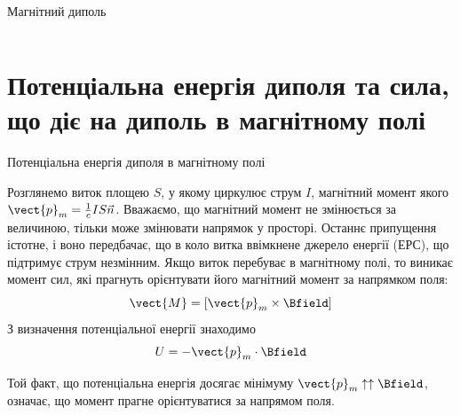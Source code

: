 \documentclass{beamer}
\begin{document}
\begin{frame}{Магнітний диполь}{}
\begin{onlyenv}
\begin{columns}
\begin{column}{0.3\linewidth}
			\end{column}
		\end{columns}
	\end{onlyenv}
\end{frame}

\section{Потенціальна енергія диполя та сила, що діє на диполь в магнітному полі}




\begin{frame}{Потенціальна енергія диполя в магнітному полі}{}\small
\begin{block}{}\justifying
Розглянемо виток площею $S$, у якому циркулює струм $I$, магнітний момент якого $\vect{p}_m = \frac1c IS\vec{n}$. Вважаємо, що магнітний момент не
змінюється за величиною, тільки може змінювати напрямок у просторі. Останнє припущення істотне, і воно передбачає, що в коло витка ввімкнене
\alert{джерело енергії (ЕРС)}, що підтримує струм незмінним. Якщо виток перебуває в магнітному полі, то виникає момент сил, які прагнуть орієнтувати
його магнітний момент за напрямком поля:
\begin{equation*}
    \vect{M} = \left[\vect{p}_m\times\Bfield\right]
\end{equation*}
З визначення потенціальної енергії знаходимо
\begin{equation*}
    U = -\vect{p}_m\cdot\Bfield
\end{equation*}
\end{block}
       \begin{block}{}
     Той факт, що потенціальна енергія досягає мінімуму $\vect{p}_m\uparrow\uparrow\Bfield$, означає, що момент прагне орієнтуватися за напрямом поля.
\end{block}
\end{frame}
\end{document}
